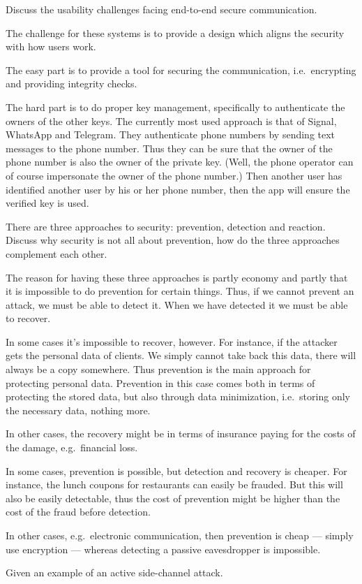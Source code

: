   Discuss the usability challenges facing end-to-end secure communication.

  \begin{solution}
    The challenge for these systems is to provide a design which aligns the 
    security with how users work.

    The easy part is to provide a tool for securing the communication, i.e.\ 
    encrypting and providing integrity checks.

    The hard part is to do proper key management, specifically to authenticate 
    the owners of the other keys.
    The currently most used approach is that of Signal, WhatsApp and Telegram.
    They authenticate phone numbers by sending text messages to the phone 
    number.
    Thus they can be sure that the owner of the phone number is also the owner 
    of the private key.
    (Well, the phone operator can of course impersonate the owner of the phone 
    number.)
    Then another user has identified another user by his or her phone number, 
    then the app will ensure the verified key is used.
  \end{solution}

\question[3]
  There are three approaches to security: prevention, detection and reaction.
  Discuss why security is not all about prevention, how do the three approaches 
  complement each other.

  \begin{solution}
    The reason for having these three approaches is partly economy and partly 
    that it is impossible to do prevention for certain things.
    Thus, if we cannot prevent an attack, we must be able to detect it.
    When we have detected it we must be able to recover.

    In some cases it's impossible to recover, however.
    For instance, if the attacker gets the personal data of clients.
    We simply cannot take back this data, there will always be a copy somewhere.
    Thus prevention is the main approach for protecting personal data.
    Prevention in this case comes both in terms of protecting the stored data, 
    but also through data minimization, i.e.\ storing only the necessary data, 
    nothing more.

    In other cases, the recovery might be in terms of insurance paying for the 
    costs of the damage, e.g.\ financial loss.

    In some cases, prevention is possible, but detection and recovery is 
    cheaper.
    For instance, the lunch coupons for restaurants can easily be frauded.
    But this will also be easily detectable, thus the cost of prevention might 
    be higher than the cost of the fraud before detection.

    In other cases, e.g.\ electronic communication, then prevention is cheap --- 
    simply use encryption --- whereas detecting a passive eavesdropper is 
    impossible.
  \end{solution}
\question[3]\label{q:sidechannels}
Given an example of an active side-channel attack.

